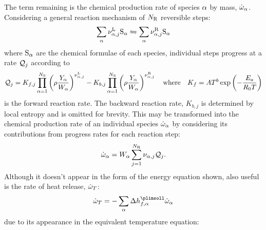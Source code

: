 The term remaining is the chemical production rate of species $\a$ by mass, $\dot{\w}_\a$. Considering a general reaction mechanism of $N_{\rm{R}}$ reversible steps:
\begin{equation}
\sum_\a \nu_{\a, j}^{\rm{L}} \rm{S}_\a \leftrightharpoons \sum_\a \nu_{\a, j}^{\rm{R}} \rm{S}_\a
\end{equation}
where $\rm{S}_\a$ are the chemical formulae of each species, individual steps progress at a rate $\cl{Q}_j$ according to
\begin{equation}
\cl{Q}_j = K_{f, j}\prod_{\a = 1}^{N_{\rm{S}}} \left(\r \frac{Y_\a}{W_\a}\right)^{\nu_{\a, j}^{\rm{L}}} - K_{b, j}\prod_{\a = 1}^{N_{\rm{S}}} \left(\r \frac{Y_\a}{W_\a}\right)^{\nu_{\a, j}^{\rm{R}}}
\quad \text{where} \quad
K_{f} = A T^b \exp\left(-\frac{E_a}{R_0 T}\right)
\end{equation}
is the forward reaction rate. The backward reaction rate, $K_{b, j}$ is determined by local entropy and is omitted for brevity. This may be transformed into the chemical production rate of an individual species $\dot{\w}_\a$ by considering its contributions from progress rates for each reaction step:
\begin{equation}
\dot{\w}_\a = W_\a \sum_{j = 1}^{N_\rm{R}} \nu_{\a, j} \cl{Q}_j.
\end{equation}
Although it doesn't appear in the form of the energy equation shown, also useful is the rate of heat release, $\dot{\w}_T$:
\begin{equation}
\dot{\w}_T = -\sum_\a \D h_{f, \a}^\plimsoll \dot{\w}_\a
\end{equation}
due to its appearance in the equivalent temperature equation:




